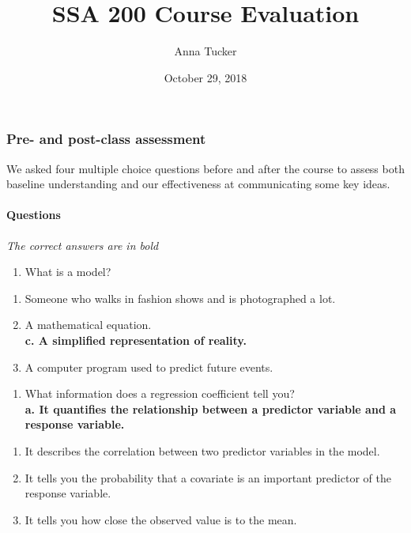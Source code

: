 \documentclass[]{article}
\title{SSA 200 Course Evaluation}
\author{Anna Tucker}
\date{October 29, 2018}
\providecommand{\tightlist}{%
  \setlength{\itemsep}{0pt}\setlength{\parskip}{0pt}}
\let\oldparagraph\paragraph
\renewcommand{\paragraph}[1]{\oldparagraph{#1}\mbox{}}
\begin{document}
\maketitle

\hypertarget{pre--and-post-class-assessment}{%
\subsubsection{Pre- and post-class
assessment}\label{pre--and-post-class-assessment}}

We asked four multiple choice questions before and after the course to
assess both baseline understanding and our effectiveness at
communicating some key ideas.

\hypertarget{questions}{%
\paragraph{Questions}\label{questions}}

\emph{The correct answers are in bold}

\begin{enumerate}
\def\labelenumi{\arabic{enumi}.}
\tightlist
\item
  What is a model?\\
\end{enumerate}

\begin{enumerate}
\def\labelenumi{\alph{enumi}.}
\tightlist
\item
  Someone who walks in fashion shows and is photographed a lot.\\
\item
  A mathematical equation.\\
  \textbf{c. A simplified representation of reality.}\\
\item
  A computer program used to predict future events.
\end{enumerate}

\begin{enumerate}
\def\labelenumi{\arabic{enumi}.}
\setcounter{enumi}{1}
\tightlist
\item
  What information does a regression coefficient tell you?\\
  \textbf{a. It quantifies the relationship between a predictor variable
  and a response variable.}\\
\end{enumerate}

\begin{enumerate}
\def\labelenumi{\alph{enumi}.}
\setcounter{enumi}{1}
\tightlist
\item
  It describes the correlation between two predictor variables in the
  model.\\
\item
  It tells you the probability that a covariate is an important
  predictor of the response variable.\\
\item
  It tells you how close the observed value is to the mean.
\end{enumerate}
\end{document}
